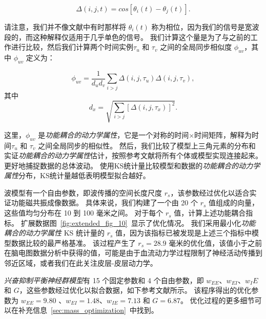 \documentclass[lang=cn,a4paper,newtx,citestyle=gb7714-2015, bibstyle=gb7714-2015]{elegantpaper}
\begin{document}
\begin{equation}\label{eq:synchrony}
	\Delta(i,j,t) = cos [\theta_i (t) - \theta_j (t)].
\end{equation}

请注意，我们并不像文献中有时那样将 $ \theta_i(t) $ 称为相位，因为我们的信号是宽波段的，而这种解释仅适用于几乎单色的信号。
我们计算这个量是为了与之前的工作进行比较\cite{deco2021dynamical,aquino2022intersection}，然后我们计算两个时间实例$ \tau_u $ 和 $ \tau_v $ 之间的全局同步相似度 $ \phi_{uv} $，其中 $ \phi_{uv} $ 定义为：

\begin{equation}\label{eq:synchrony_similarity}
	\phi_{uv} = \frac{1}{d_u d_v} 
				\sum_{i>j} \Delta(i,j,\tau_u) \Delta(i,j,\tau_v),
\end{equation}
%
其中
\begin{equation}\label{key}
	d_x = \sqrt{\sum_{i>j}
					[
					\Delta(i,j,\tau_x)
					]^2
				}.
\end{equation}

这里，$ \phi_{uv} $ 是\textit{功能耦合的动力学属性}，它是一个对称的时间$ \times $时间矩阵，解释为时间$ \tau_u $ 和 $ \tau_v $ 之间全局同步的相似性。
然后，我们比较了模型上三角元素的分布和实证\textit{功能耦合的动力学属性}估计，按照参考文献将所有个体或模型实现连接起来\cite{aquino2022intersection}。
更好地捕捉数据的总体波动。
使用KS统计量比较模型和数据的\textit{功能耦合的动力学属性}分布，KS统计量越低表明模型拟合越好。


波模型有一个自由参数，即波传播的空间长度尺度 $ r_s $，该参数经过优化以适合实证功能磁共振成像数据。
具体来说，我们构建了一个由 20 个 $ r_s $ 值组成的向量，这些值均匀分布在 10 到 100 毫米之间。
对于每个 $ r_s $ 值，计算上述功能耦合指标。
扩展数据图~\ref{fig:extended_fig_10}~显示了优化情况。
我们采用最小化\textit{功能耦合的动力学属性} KS 统计量的 $ r_s $ 值，因为该指标已被发现是上述三个指标中模型数据比较的最严格基准\cite{aquino2022intersection}。
该过程产生了 $ r_s = 28.9 $ 毫米的优化值，该值小于之前在脑电图数据分析中获得的值\cite{robinson2005multiscale}，可能是由于血流动力学过程限制了神经活动传播到邻近区域，或者我们在此关注皮层-皮层动力学\cite{aquino2012hemodynamic,pang2017effects}。


\textit{兴奋抑制平衡}\textit{神经群模型}有 15 个固定参数和 4 个自由参数，即 $ w_{EE} $、$ w_{EI} $、$ w_IE $ 和 $ G $，这些参数经过优化以拟合数据，如下参考文献\cite{demirtacs2019hierarchical}所示。
该程序得出的优化参数为 $ w_{EE} = 9.80 $ 、$ w_{EI} = 1.48 $、$ w_{IE} = 7.13 $ 和 $ G = 6.87 $。
优化过程的更多细节可以在补充信息~\ref{sec:mass_optimization}~中找到。
\end{document}
